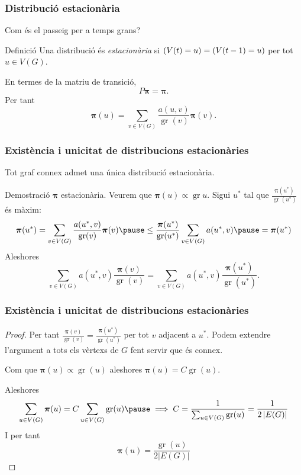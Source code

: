 \documentclass[aspectratio=169, 12pt]{beamer}
\let\P\relax
\DeclareMathOperator{\P}{P}
\renewcommand{\vec}[1]{\mathbf{\bm #1}}
\DeclareMathOperator{\gr}{gr}
\newcommand{\abs}[1]{\left\lvert #1 \right\rvert}
\begin{document}
\begin{frame}
	\frametitle{Distribució estacionària}
	Com és el passeig per a temps grans? \pause

	\begin{block}{Definició}
		Una distribució és \emph{estacionària} si \( \P(V(t) = u) = \P(V(t - 1) = u) \) per tot \( u \in V(G) \).
	\end{block} \pause

	En termes de la matriu de transició, \[ P\vec{\pi} = \vec{\pi}. \] \pause
	Per tant
	\begin{equation*}
		\vec{\pi}(u) = \sum_{v \in V(G)}\frac{a(u,v)}{\gr(v)} \vec{\pi}(v).
	\end{equation*}

\end{frame}

\begin{frame}
	\frametitle{Existència i unicitat de distribucions estacionàries}
	\begin{theorem}
		Tot graf connex admet una única distribució estacionària.
	\end{theorem}
	\pause

	\begin{block}{Demostració}
		\( \vec{\pi} \) estacionària. Veurem que \( \vec{\pi}(u) \propto \gr{u} \). \pause Sigui \( u^\ast \) tal que \( \frac{\vec{\pi}(u^\ast)}{\gr(u^\ast)} \) és màxim: \pause 
		\begin{equation*}
			\vec{\pi}(u^\ast) = \sum_{v \in V(G)} \frac{a(u^\ast,v)}{\gr(v)} \vec{\pi}(v) \pause \leq \frac{\vec{\pi}(u^\ast)}{\gr(u^\ast)} \sum_{v \in V(G)} a(u^{\ast},v) \pause = \vec{\pi}(u^\ast)
		\end{equation*}
		Aleshores \[ \sum_{v \in V(G)} a(u^\ast,v) \frac{\vec{\pi}(v)}{\gr(v)}  = \sum_{v \in V(G)} a(u^\ast,v) \frac{\vec{\pi}(u^\ast)}{\gr(u^\ast)}. \]  
	\end{block}
\end{frame}

\begin{frame}
	\frametitle{Existència i unicitat de distribucions estacionàries}
	\begin{proof}
		Per tant \( \frac{\vec{\pi}(v)}{\gr(v)} = \frac{\vec{\pi}(u^\ast)}{\gr(u^\ast)} \) per tot \( v \) adjacent a \( u^\ast \). \pause
		Podem extendre l'argument a tots els vèrtexs de \( G \) fent servir que és connex. \pause

		Com que \( \vec{\pi}(u) \propto \gr(u) \) aleshores \( \vec{\pi}(u) = C\gr(u) \). \pause

		Aleshores
		\begin{equation*}
			\sum_{u \in V(G)} \vec{\pi}(u) = C \sum_{u \in V(G)} \gr(u) \pause \implies C = \frac{1}{\sum_{u \in V(G)} \gr(u)} = \frac{1}{2\abs{E(G)}}
		\end{equation*} \pause
		I per tant 
		\begin{equation*}
			\vec{\pi}(u) = \frac{\gr(u)}{2 \abs{E(G)}}
		\end{equation*}

	\end{proof}
\end{frame}
\end{document}
